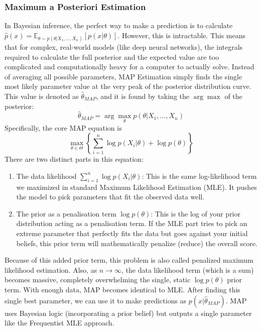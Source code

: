 \documentclass[../Probability.tex]{subfiles}
\begin{document}
\subsubsection{Maximum a Posteriori Estimation}
In Bayesian inference, the perfect way to make a prediction is to calculate $\hat{p}(x) = \mathbb{E}_{\theta \sim p(\theta|X_1, ..., X_n)}[p(x|\theta)]$.\newline
However, this is intractable. This means that for complex, real-world models (like deep neural networks), the integrals required to calculate the full posterior and the expected value are too complicated and computationally heavy for a computer to actually solve.\newline
Instead of averaging all possible parameters, MAP Estimation simply finds the single most likely parameter value at the very peak of the posterior distribution curve.\newline
This value is denoted as $\hat{\theta}_{MAP}$, and it is found by taking the $\arg\max$ of the posterior:
$$\hat{\theta}_{MAP} = \arg\max_\theta p(\theta|X_1, ..., X_n)$$
Specifically, the core MAP equation is
$$\max_{\theta \in \Theta} \left\{ \sum_{i=1}^n \log p(X_i|\theta) + \log p(\theta) \right\}$$
There are two distinct parts in this equation:
\begin{enumerate}
    \item The data likelihood $\sum_{i=1}^n \log p(X_i|\theta)$: This is the same log-likelihood term we maximized in standard Maximum Likelihood Estimation (MLE). It pushes the model to pick parameters that fit the observed data well.
    \item The prior as a penalisation term $\log p(\theta)$: This is the log of your prior distribution acting as a penalisation term. If the MLE part tries to pick an extreme parameter that perfectly fits the data but goes against your initial beliefs, this prior term will mathematically penalize (reduce) the overall score.
\end{enumerate}
Because of this added prior term, this problem is also called penalized maximum likelihood estimation.\newline
Also, as $n \to \infty$, the data likelihood term (which is a sum) becomes massive, completely overwhelming the single, static $\log p(\theta)$ prior term. With enough data, MAP becomes identical to MLE.\newline
\newline 
After finding this single best parameter, we can use it to make predictions as $p(x|\hat{\theta}_{MAP})$.\newline
MAP uses Bayesian logic (incorporating a prior belief) but outputs a single parameter like the Frequentist MLE approach.
\end{document}
